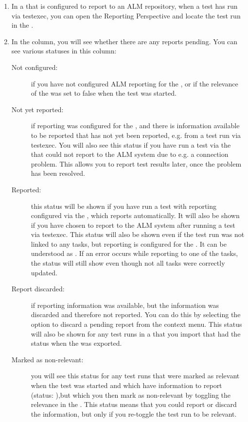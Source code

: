 \begin{enumerate}
\item In a \gdproject{} that is configured to report to an ALM repository, when a test has run via testexec, you can open the Reporting Perspective and locate the test run in the \gdtestsummaryview{}.
\item In the  column, you will see whether there are any reports pending. You can see various statuses in this column:

\begin{description}
\item [Not configured:]{if you have not configured ALM reporting for the \gdproject{}, or if the relevance of the \gdsuite{} was set to false when the test was started.}
\item [Not yet reported:]{if reporting was configured for the \gdproject{}, and there is information available to be reported that has not yet been reported, e.g. from a test run via testexec. You will also see this status if you have run a test via the \ite{} that could not report to the ALM system due to e.g. a connection problem. This allows you to report test results later, once the problem has been resolved.}
\item [Reported:]{this status will be shown if you have run a test with reporting configured via the \ite{}, which reports automatically. It will also be shown if you have chosen to report to the ALM system after running a test via testexec. This status will also be shown even if the test run was not linked to any tasks, but reporting is configured for the \gdproject{}. It can be understood as . If an error occurs while reporting to one of the tasks, the status will still show  even though not all tasks were correctly updated.}
\item [Report discarded:]{if reporting information was available, but the information was discarded and therefore not reported. You can do this by selecting the option to discard a pending report from the context menu. This status will also be shown for any test runs in a \gdproject{} that you import that had the status  when the \gdproject{} was exported.}
\item [Marked as non-relevant:]{you will see this status for any test runs that were marked as relevant when the test was started and which have information to report (status: ),but which you then mark as non-relevant by toggling the relevance in the \gdtestsummaryview{}. This status means that you could report or discard the information, but only if you re-toggle the test run to be relevant.}

\end{description}
\end{enumerate}
